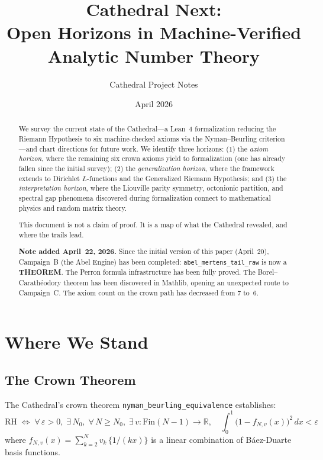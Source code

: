 \documentclass[11pt,a4paper]{article}
\title{%
  Cathedral Next:\\
  Open Horizons in Machine-Verified\\
  Analytic Number Theory%
}
\author{
  Cathedral Project Notes
}
\date{April 2026}
\theoremstyle{definition}
\newcommand{\RH}{\mathrm{RH}}
\newcommand{\RR}{\mathbb{R}}
\newcommand{\lean}[1]{\texttt{#1}}
\begin{document}
\maketitle

\begin{abstract}
We survey the current state of the Cathedral---a Lean~4 formalization
reducing the Riemann Hypothesis to six machine-checked axioms via the
Nyman--Beurling criterion---and chart directions for future work. We
identify three horizons: (1) the \emph{axiom horizon}, where the
remaining six crown axioms yield to formalization (one has already
fallen since the initial survey); (2) the
\emph{generalization horizon}, where the framework extends to Dirichlet
$L$-functions and the Generalized Riemann Hypothesis; and (3) the
\emph{interpretation horizon}, where the Liouville parity symmetry,
octonionic partition, and spectral gap phenomena discovered during
formalization connect to mathematical physics and random matrix theory.

This document is not a claim of proof. It is a map of what the Cathedral
revealed, and where the trails lead.

\textbf{Note added April~22, 2026.} Since the initial version of this
paper (April~20), Campaign~B (the Abel Engine) has been completed:
\lean{abel\_mertens\_tail\_raw} is now a \textbf{THEOREM}. The Perron
formula infrastructure has been fully proved. The Borel--Carath\'eodory
theorem has been discovered in Mathlib, opening an unexpected route to
Campaign~C. The axiom count on the crown path has decreased from 7 to~6.
\end{abstract}

\tableofcontents

\section{Where We Stand}
\label{sec:status}

\subsection{The Crown Theorem}

The Cathedral's crown theorem \lean{nyman\_beurling\_equivalence}
establishes:
\[
  \RH \;\iff\;
  \forall\,\varepsilon > 0,\;\exists\,N_0,\;\forall\,N \geq N_0,\;
  \exists\,v : \mathrm{Fin}(N-1) \to \RR,\quad
  \int_0^1 \bigl(1 - f_{N,v}(x)\bigr)^2\,dx < \varepsilon
\]
where $f_{N,v}(x) = \sum_{k=2}^{N} v_k\,\{1/(kx)\}$ is a linear
combination of B\'aez-Duarte basis functions.
\end{document}
